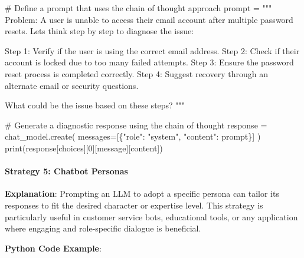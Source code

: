 \documentclass[
]{agujournal2019}
\let\oldparagraph\paragraph
\renewcommand{\paragraph}[1]{\oldparagraph{#1}\mbox{}}
\newenvironment{Shaded}{\begin{snugshade}}{\end{snugshade}}
\newcommand{\BuiltInTok}[1]{\textcolor[rgb]{0.00,0.23,0.31}{#1}}
\newcommand{\CommentTok}[1]{\textcolor[rgb]{0.37,0.37,0.37}{#1}}
\newcommand{\DecValTok}[1]{\textcolor[rgb]{0.68,0.00,0.00}{#1}}
\newcommand{\NormalTok}[1]{\textcolor[rgb]{0.00,0.23,0.31}{#1}}
\newcommand{\OperatorTok}[1]{\textcolor[rgb]{0.37,0.37,0.37}{#1}}
\newcommand{\StringTok}[1]{\textcolor[rgb]{0.13,0.47,0.30}{#1}}
\begin{document}
\begin{Shaded}
\begin{Highlighting}[]
\CommentTok{\# Define a prompt that uses the chain of thought approach}
\NormalTok{prompt }\OperatorTok{=} \StringTok{"""}
\StringTok{Problem: A user is unable to access their email account after multiple password resets. Let\textquotesingle{}s think step by step to diagnose the issue:}

\StringTok{Step 1: Verify if the user is using the correct email address.}
\StringTok{Step 2: Check if their account is locked due to too many failed attempts.}
\StringTok{Step 3: Ensure the password reset process is completed correctly.}
\StringTok{Step 4: Suggest recovery through an alternate email or security questions.}

\StringTok{What could be the issue based on these steps?}
\StringTok{"""}

\CommentTok{\# Generate a diagnostic response using the chain of thought}
\NormalTok{response }\OperatorTok{=}\NormalTok{ chat\_model.create(}
\NormalTok{    messages}\OperatorTok{=}\NormalTok{[\{}\StringTok{"role"}\NormalTok{: }\StringTok{"system"}\NormalTok{, }\StringTok{"content"}\NormalTok{: prompt\}]}
\NormalTok{)}
\BuiltInTok{print}\NormalTok{(response[}\StringTok{\textquotesingle{}choices\textquotesingle{}}\NormalTok{][}\DecValTok{0}\NormalTok{][}\StringTok{\textquotesingle{}message\textquotesingle{}}\NormalTok{][}\StringTok{\textquotesingle{}content\textquotesingle{}}\NormalTok{])}
\end{Highlighting}
\end{Shaded}

\paragraph{Strategy 5: Chatbot
Personas}\label{strategy-5-chatbot-personas}

\textbf{Explanation}: Prompting an LLM to adopt a specific persona can
tailor its responses to fit the desired character or expertise level.
This strategy is particularly useful in customer service bots,
educational tools, or any application where engaging and role-specific
dialogue is beneficial.

\textbf{Python Code Example}:
\end{document}
